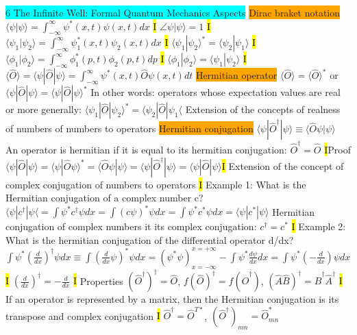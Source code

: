 \documentclass[fontsize=4pt]{scrartcl}
\begin{document}
\colorbox{Cyan}{6 The Infinite Well: Formal Quantum Mechanics Aspects}
\colorbox{Orange}{Dirac braket notation}
$\langle \psi | \psi \rangle = \int_{-\infty}^{\infty} \psi^* (x,t) \psi(x,t)dx$
\hl{I}
$\angle \psi | \psi \rangle = 1$
\hl{I}
$\langle \psi_1 | \psi_2 \rangle = \int_{-\infty}^{\infty} \psi_1^* (x,t) \psi_2(x,t)dx$
\hl{I}
$\langle \psi_1 | \psi_2 \rangle^* = \langle \psi_2 | \psi_1 \rangle$
\hl{I}
$\langle \phi_1 | \phi_2 \rangle = \int_{-\infty}^{\infty} \phi_1^* (p,t) \phi_2(p,t)dp$
\hl{I}
$\langle \phi_1 | \phi_2 \rangle = \langle \psi_1 | \psi_2 \rangle$
\hl{I}
$\langle \hat{O} \rangle = \langle \psi | \hat{O} | \psi \rangle = \int_{-\infty}^{\infty} \psi^* (x,t) \hat{O} \psi(x,t)dt   $
\colorbox{Orange}{Hermitian operator}
$\langle \hat{O} \rangle = \langle \hat{O} \rangle^*$
or
$\langle \psi | \hat{O}|\psi \rangle = \langle \psi | \hat{O}|\psi \rangle^*$ In other words: operators whose expectation values are real
or more generally: 
$\langle \psi_1 | \hat{O} | \psi_2 \rangle^* = \langle \psi_2 | \hat{O} | \psi_1 \langle$
Extension of the concepts of realness of numbers of numbers to operators  
\colorbox{Orange}{Hermitian conjugation}
$\langle \psi | \hat{O}^{\dag} | \psi \rangle \equiv \langle \hat{O} \psi | \psi \rangle$
An operator is hermitian if it is equal to its hermitian conjugation:  $\hat{O}^{\dag} = \hat{O}$
\hl{I}Proof $\langle \psi | \hat{O} | \psi \rangle = \langle \psi | \hat{O} \psi \rangle^* = \langle \hat{O} \psi | \psi \rangle = \langle \psi | \hat{O}^{\dag} | \psi \rangle = \langle \psi | \hat{O} | \psi \rangle$\hl{I}
Extension of the concept of complex conjugation of numbers to operators
\hl{I}
Example 1: What is the Hermitian conjugation of a complex number c?
$\langle \psi | c^{\dag} | \psi \langle = \int \psi^* c^{\dag} \psi dx = \int (c\psi)^* \psi dx = \int \psi^* c^* \psi dx = \langle \psi | c^* | \psi \rangle$
Hermitian conjugation of complex numbers it its complex conjugation: $c^{\dag} = c^*$
\hl{I}
Example 2: What is the hermitian conjugation of the differential operator d/dx?
$\int \psi^* (\frac{d}{dx})^{\dag} \psi dx \equiv \int (\frac{d}{dx}\psi)^* \psi dx = (\psi^* \psi)_{x=-\infty}^{x=+\infty} - \int \psi^* \frac{d\psi}{dx}dx = \int \psi^* (-\frac{d}{dx})\psi dx$
\hl{I}
$(\frac{d}{dx})^{\dag} = -\frac{d}{dx}$ 
\hl{I}
Properties $(\hat{O}^{\dag})^{\dag} = \hat{O}$, $f(\hat{O})^{\dag} = f(\hat{O}^{\dag})$, $(\hat{A}\hat{B})^{\dag} = \hat{B}^{\dag} \hat{A}^{\dag}$
\hl{I}
If an operator is represented by a matrix, then the Hermitian conjugation is its transpose and complex conjugation
\hl{I}
$\hat{O}^{\dag} = \hat{O}^{T*}$, $(\hat{O}^{\dag})_{mn} = \hat{O}_{mn}^{*}$
\end{document}
